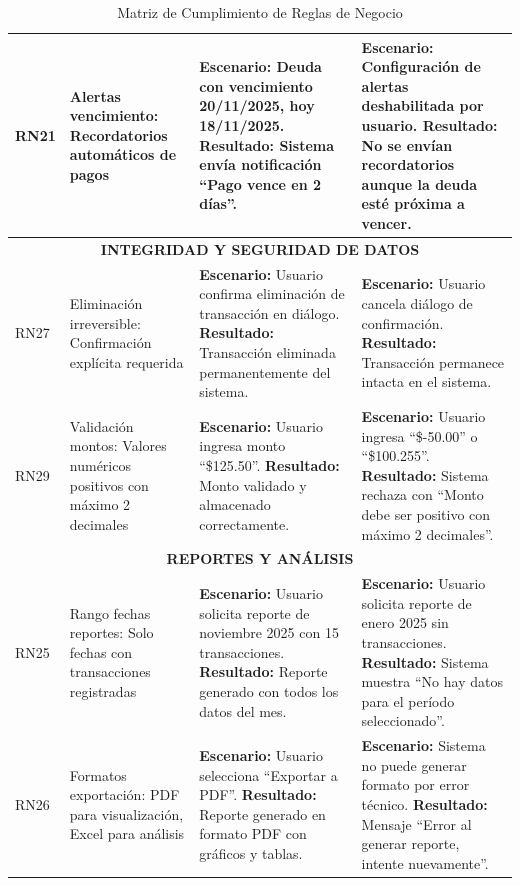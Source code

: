 \begin{table}[H]
\begin{tabular}{|p{1.2cm}|p{3.5cm}|p{4cm}|p{4cm}|}
RN21 & Alertas vencimiento: Recordatorios automáticos de pagos & 
\textbf{Escenario:} Deuda con vencimiento 20/11/2025, hoy 18/11/2025. \newline
\textbf{Resultado:} Sistema envía notificación ``Pago vence en 2 días''. &
\textbf{Escenario:} Configuración de alertas deshabilitada por usuario. \newline
\textbf{Resultado:} No se envían recordatorios aunque la deuda esté próxima a vencer. \\
\hline

\hline
\multicolumn{4}{|c|}{\textbf{INTEGRIDAD Y SEGURIDAD DE DATOS}} \\
\hline

RN27 & Eliminación irreversible: Confirmación explícita requerida & 
\textbf{Escenario:} Usuario confirma eliminación de transacción en diálogo. \newline
\textbf{Resultado:} Transacción eliminada permanentemente del sistema. &
\textbf{Escenario:} Usuario cancela diálogo de confirmación. \newline
\textbf{Resultado:} Transacción permanece intacta en el sistema. \\
\hline

RN29 & Validación montos: Valores numéricos positivos con máximo 2 decimales & 
\textbf{Escenario:} Usuario ingresa monto ``\$125.50''. \newline
\textbf{Resultado:} Monto validado y almacenado correctamente. &
\textbf{Escenario:} Usuario ingresa ``\$-50.00'' o ``\$100.255''. \newline
\textbf{Resultado:} Sistema rechaza con ``Monto debe ser positivo con máximo 2 decimales''. \\
\hline

\hline
\multicolumn{4}{|c|}{\textbf{REPORTES Y ANÁLISIS}} \\
\hline

RN25 & Rango fechas reportes: Solo fechas con transacciones registradas & 
\textbf{Escenario:} Usuario solicita reporte de noviembre 2025 con 15 transacciones. \newline
\textbf{Resultado:} Reporte generado con todos los datos del mes. &
\textbf{Escenario:} Usuario solicita reporte de enero 2025 sin transacciones. \newline
\textbf{Resultado:} Sistema muestra ``No hay datos para el período seleccionado''. \\
\hline

RN26 & Formatos exportación: PDF para visualización, Excel para análisis & 
\textbf{Escenario:} Usuario selecciona ``Exportar a PDF''. \newline
\textbf{Resultado:} Reporte generado en formato PDF con gráficos y tablas. &
\textbf{Escenario:} Sistema no puede generar formato por error técnico. \newline
\textbf{Resultado:} Mensaje ``Error al generar reporte, intente nuevamente''. \\
\hline

\end{tabular}
\caption{Matriz de Cumplimiento de Reglas de Negocio}
\label{tab:matriz-cumplimiento-rn}
\end{table}